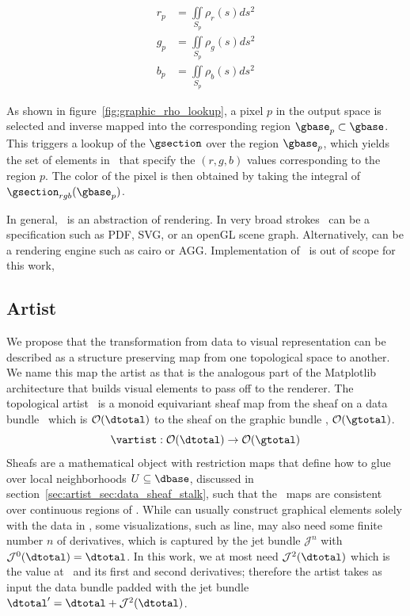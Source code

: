 \documentclass[../main.tex]{subfiles}
\begin{document}
\begin{align}
    r_p &= \iint\limits_{S_p} \rho_r(s)ds^{2}\\
    g_p &= \iint\limits_{S_p} \rho_g(s)ds^{2}\\
    b_p &= \iint\limits_{S_p} \rho_b(s)ds^{2}
\end{align}

As shown in figure~\ref{fig:graphic_rho_lookup}, a pixel $p$ in the output space is selected and inverse mapped into the corresponding region $\gbase_p \subset \gbase$. This triggers a lookup of the $\gsection$ over the region $\gbase_p$, which yields the set of elements in \gfiber\ that specify the $(r, g, b)$ values corresponding to the region $p$. The color of the pixel is then obtained by taking the integral of $\gsection_{rgb}(\gbase_p)$. 

In general, \gsection\ is an abstraction of rendering. In very broad strokes \gsection\  can be a specification such as PDF\cite{bienz1993portable}, SVG\cite{quintScalable2003}, or an openGL scene graph\cite{CarsonOpenGL1997}. Alternatively, \gsection can be a rendering engine such as cairo\cite{CairographicsOrg} or AGG\cite{AntiGrainGeometry}. Implementation of \gsection\ is out of scope for this work,

\subsection{Artist}
\label{sec:artist}
We propose that the transformation from data to visual representation can be described as a structure preserving map from one topological space to another. We name this map the artist as that is the analogous part of the  Matplotlib\cite{hunterArchitectureOpenSource} architecture that builds visual elements to pass off to the renderer. The topological artist \vartist\ is a monoid equivariant sheaf map from the sheaf on a data bundle \dtotal\ which is $\mathcal{O}(\dtotal)$ to the sheaf on the graphic bundle \gtotal, $\mathcal{O}(\gtotal)$. 
\begin{equation}
    \vartist: \mathcal{O}(\dtotal) \rightarrow \mathcal{O}(\gtotal)
\end{equation}
Sheafs are a mathematical object with restriction maps that define how to glue \dsection over local neighborhoods $U \subseteq \dbase$,  discussed in section~\ref{sec:artist_sec:data_sheaf_stalk}, such that the \vartist\ maps are consistent over continuous regions of \dbase. While \vartist can usually construct graphical elements solely with the data in \dsection, some visualizations, such as line, may also need some finite number $n$ of derivatives, which is captured by the jet bundle $\mathcal{J}^n$ \cite{JetBundle2020,musilovaCalculusVariationsJet2016} with $\mathcal{J}^{0}(\dtotal)=\dtotal$. In this work, we at most need $\mathcal{J}^{2}(\dtotal)$ which is the value at \dsection\ and its first and second derivatives; therefore the artist takes as input the data bundle padded with the jet bundle $\dtotal^{\prime} = \dtotal + \mathcal{J}^{2}(\dtotal)$. 
\end{document}
